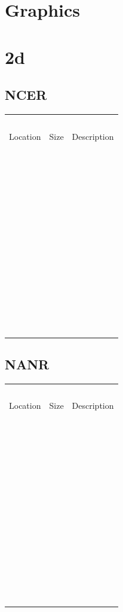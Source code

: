 \documentclass[
]{book}
\begin{document}
\hypertarget{graphics-1}{%
\chapter{Graphics}\label{graphics-1}}

\hypertarget{d-1}{%
\chapter{2d}\label{d-1}}

\hypertarget{ncer}{%
\section{NCER}\label{ncer}}

\begin{longtable}[]{@{}lll@{}}
\toprule()
\endhead
  &   &   \\
Location & Size & Description \\
  &   &   \\
  &   &   \\
  &   &   \\
  &   &   \\
  &   &   \\
  &   &   \\
  &   &   \\
  &   &   \\
  &   &   \\
  &   &   \\
  &   &   \\
  &   &   \\
  &   &   \\
\bottomrule()
\end{longtable}

\hypertarget{nanr}{%
\section{NANR}\label{nanr}}

\begin{longtable}[]{@{}lll@{}}
\toprule()
\endhead
  &   &   \\
Location & Size & Description \\
  &   &   \\
  &   &   \\
  &   &   \\
  &   &   \\
  &   &   \\
  &   &   \\
  &   &   \\
  &   &   \\
  &   &   \\
  &   &   \\
  &   &   \\
  &   &   \\
  &   &   \\
\bottomrule()
\end{longtable}
\end{document}
